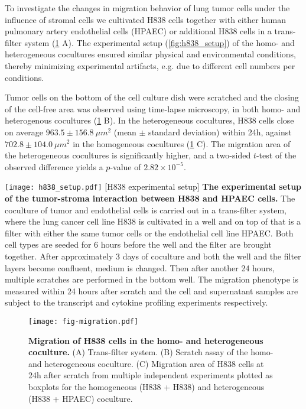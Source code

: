 To investigate the changes in migration behavior of lung tumor cells under the 
influence of stromal cells we cultivated  
H838 cells  together with either human pulmonary artery endothelial cells (HPAEC) or additional H838 cells in a trans-filter system (\ref{fig:migration} A).
The experimental setup (\ref{fig:h838_setup}) of the homo- and heterogeneous cocultures ensured 
similar physical and environmental conditions, thereby minimizing 
experimental artifacts, e.g. due to different cell numbers per conditions. 

Tumor cells on the bottom of the cell culture dish were scratched and the 
closing of the cell-free area was observed using time-lapse microscopy, in both
homo- and heterogenous cocultures (\ref{fig:migration} B).
In the heterogeneous cocultures, 
H838 cells close on average $963.5\pm156.8\ \mu m^2$ 
(mean $\pm$ standard deviation) within 24h, 
against $702.8\pm104.0\ \mu m^2$ in the homogeneous cocultures 
(\ref{fig:migration} C). 
The migration area of the heterogeneous cocultures is significantly higher, and
a two-sided  $t$-test of the observed difference yields a 
$p$-value of 
$2.82 \times 10^{-5}$.

\begin{center}
\captionsetup{labelformat=prepage}
\texttt{[image: h838\_setup.pdf]}
\newpage
[H838 experimental setup]{
{\bf The experimental setup of the tumor-stroma interaction 
between H838 and HPAEC cells.} 
The coculture of tumor and endothelial cells is carried out
in a trans-filter system, where the lung cancer cell line
H838 is cultivated in a well and on top of that is a filter
with either the same tumor cells or the endothelial cell
line HPAEC. Both cell types are seeded for 6 hours before 
the well and the filter are brought together. After 
approximately 3 days of coculture and both the well and the 
filter layers become confluent, medium is changed. Then
after another 24 hours, multiple scratches are performed
in the bottom well. The migration phenotype is measured within
24 hours after scratch and the cell and supernatant samples 
are subject to the transcript and cytokine profiling 
experiments respectively.
}
\label{fig:h838_setup}
\end{center}

\begin{figure}[!ht]
\begin{center}
\texttt{[image: fig-migration.pdf]}
\end{center}
\caption[H838 migration in homo- and heterogeneous coculture]{
{\bf Migration of H838 cells in the homo- and heterogeneous coculture.} 
(A) Trans-filter system. (B) Scratch assay of the homo- and heterogeneous coculture.
(C) Migration area of H838 cells at 24h after scratch from multiple independent 
experiments 
plotted as 
boxplots for the homogeneous (H838 + H838) and heterogeneous (H838 + HPAEC) 
coculture.
}
\label{fig:migration}
\end{figure}

